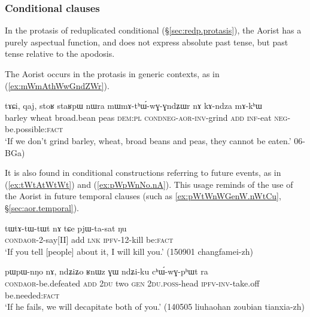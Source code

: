 \subsubsection{Conditional clauses }   \label{sec:aor.cond}
In the protasis of reduplicated conditional (§\ref{sec:redp.protasis}), the Aorist has a purely aspectual function, and does not express absolute past tense, but past tense relative to the apodosis.

The Aorist occurs in the protasis in generic contexts, as in (\ref{ex:mWmAthWwGndZWr}).

\begin{exe}
\ex \label{ex:mWmAthWwGndZWr}
 \gll tɤɕi, qaj, stoʁ staʁpɯ nɯra mɯ\redp{}mɤ-tʰɯ́-wɣ-ɣndʑɯr nɤ kɤ-ndza mɤ-kʰɯ \\
 barley wheat broad.bean peas \textsc{dem}:\textsc{pl} \textsc{cond}\redp{}\textsc{neg}-\textsc{aor}-\textsc{inv}-grind \textsc{add} \textsc{inf}-eat \textsc{neg}-be.possible:\textsc{fact} \\
 \glt `If we don't grind barley, wheat, broad beans and peas, they cannot be eaten.' 06-BGa)
\end{exe}

It is also found in conditional constructions referring to future events, as in (\ref{ex:tWtAtWtWt}) and (\ref{ex:pWpWnNo.nA}). This usage reminds of the use of the Aorist in future temporal clauses (such as \ref{ex:pWtWnWGenW.nWtCu}, §\ref{sec:aor.temporal}).

\begin{exe}
\ex \label{ex:tWtAtWtWt}
 \gll  tɯ\redp{}tɤ-tɯ-tɯt nɤ tɕe pjɯ-ta-sat ŋu \\
 \textsc{cond}\redp{}\textsc{aor}-2-say[II] add \textsc{lnk} \textsc{ipfv}-1\fl{}2-kill be:\textsc{fact} \\
 \glt `If you tell [people] about it, I will kill you.' (150901 changfamei-zh) 
\end{exe}
 
\begin{exe}
\ex \label{ex:pWpWnNo.nA}
\gll pɯ\redp{}pɯ-nŋo nɤ, ndʑiʑo ʁnɯz ɣɯ ndʑi-ku cʰɯ́-wɣ-pʰɯt ra \\
 \textsc{cond}\redp{}\textsc{aor}-be.defeated \textsc{add} \textsc{2du} two \textsc{gen} \textsc{2du}.\textsc{poss}-head \textsc{ipfv}-\textsc{inv}-take.off be.needed:\textsc{fact} \\
 \glt `If he fails, we will decapitate both of you.' (140505 liuhaohan zoubian tianxia-zh)
\end{exe}


